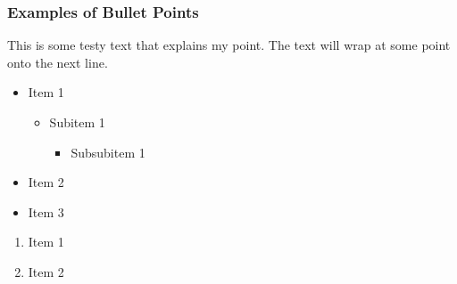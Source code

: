 \begin{frame}
	\frametitle{Examples of Bullet Points}
	This is some testy text that explains my point. The text will wrap at some point onto the next line.

	\begin{itemize}
		\item{Item 1}
		\begin{itemize}
      \item{Subitem 1}
      \begin{itemize}
        \item{Subsubitem 1}
      \end{itemize}
    \end{itemize}
		\item{Item 2}
		\item{Item 3}
	\end{itemize}

  \begin{enumerate}
    \item{Item 1}
    \item{Item 2}
  \end{enumerate}



\end{frame}